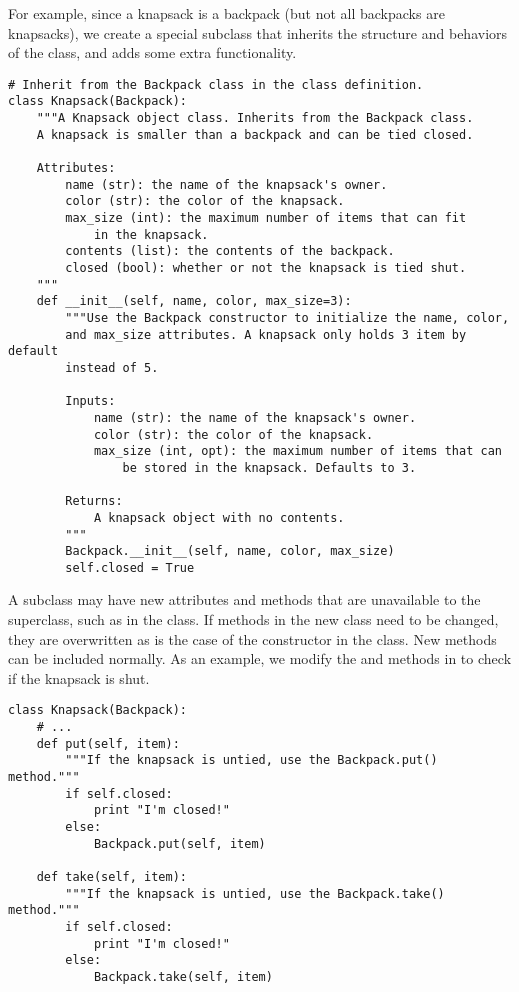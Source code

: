 For example, since a knapsack is a backpack (but not all backpacks are knapsacks), we create a special  subclass that inherits the structure and behaviors of the  class, and adds some extra functionality.

\begin{lstlisting}
# Inherit from the Backpack class in the class definition.
class Knapsack(Backpack):
    """A Knapsack object class. Inherits from the Backpack class.
    A knapsack is smaller than a backpack and can be tied closed.
    
    Attributes:
        name (str): the name of the knapsack's owner.
        color (str): the color of the knapsack.
        max_size (int): the maximum number of items that can fit
            in the knapsack.
        contents (list): the contents of the backpack.
        closed (bool): whether or not the knapsack is tied shut.
    """
    def __init__(self, name, color, max_size=3):
        """Use the Backpack constructor to initialize the name, color,
        and max_size attributes. A knapsack only holds 3 item by default
        instead of 5.

        Inputs:
            name (str): the name of the knapsack's owner.
            color (str): the color of the knapsack.
            max_size (int, opt): the maximum number of items that can
                be stored in the knapsack. Defaults to 3.
        
        Returns:
            A knapsack object with no contents.
        """
        Backpack.__init__(self, name, color, max_size)
        self.closed = True
\end{lstlisting}

A subclass may have new attributes and methods that are unavailable to the superclass, such as  in the  class.
If methods in the new class need to be changed, they are overwritten as is the case of the constructor in the  class.
New methods can be included normally.
As an example, we modify the  and  methods in  to check if the knapsack is shut.

\begin{lstlisting}
class Knapsack(Backpack):
    # ...
    def put(self, item):
        """If the knapsack is untied, use the Backpack.put() method."""
        if self.closed:
            print "I'm closed!"
        else:
            Backpack.put(self, item)
    
    def take(self, item):
        """If the knapsack is untied, use the Backpack.take() method."""
        if self.closed:
            print "I'm closed!"
        else:
            Backpack.take(self, item)
\end{lstlisting}


